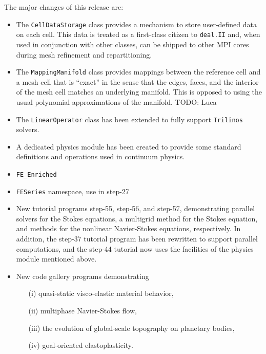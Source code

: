 \documentclass{ansarticle-preprint}
\newcommand{\specialword}[1]{\texttt{#1}}
\newcommand{\dealii}{{\specialword{deal.II}}}
\newcommand{\trilinos}{{\specialword{Trilinos}}}
\begin{document}
The major changes of this release are:
\begin{itemize}
\item The \texttt{CellDataStorage} class provides a mechanism to store user-defined data on each cell.
This data is treated as a first-class citizen to \dealii{} and, when used in conjunction with other classes, can be shipped to other MPI cores during mesh refinement and repartitioning.

\item The \texttt{MappingManifold} class provides mappings between the
  reference cell and a mesh cell that is ``exact'' in the sense that
  the edges, faces, and the interior of the mesh cell matches an
  underlying manifold. This is opposed to using the usual polynomial
  approximations of the manifold.
  TODO: Luca

\item The \texttt{LinearOperator} class has been extended to fully support {\trilinos} solvers.

\item A dedicated physics module has been created to provide some standard definitions and operations used in continuum physics.

\item \texttt{FE\_Enriched}

\item \texttt{FESeries} namespace, use in step-27

\item New tutorial programs step-55, step-56, and step-57,
  demonstrating parallel solvers for the Stokes equations, a multigrid
  method for the Stokes equation, and methods for the nonlinear
  Navier-Stokes equations, respectively. In addition, the step-37
  tutorial program has been rewritten to support parallel
  computations, and the step-44 tutorial now uses the facilities of
  the physics module mentioned above.

\item New code gallery programs demonstrating
  \begin{enumerate}
    \item[(i)] quasi-static visco-elastic material behavior, 
    \item[(ii)] multiphase Navier-Stokes flow,
    \item[(iii)] the evolution of global-scale topography on planetary bodies,
    \item[(iv)] goal-oriented elastoplasticity.
  \end{enumerate}


\end{itemize}
\end{document}
